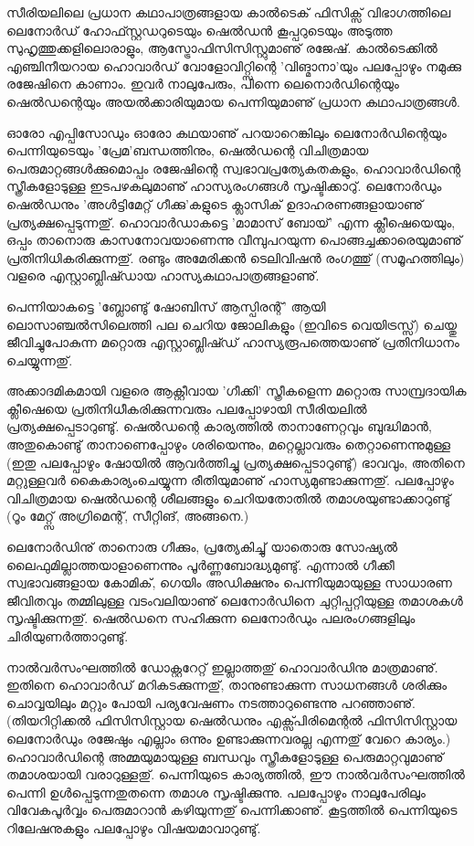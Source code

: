 സീരിയലിലെ പ്രധാന കഥാപാത്രങ്ങളായ കാല്‍ടെക് ഫിസിക്സ് വിഭാഗത്തിലെ ലെനോര്‍ഡ് ഹോഫ്സ്റ്റഡറുടെയും ഷെല്‍ഡന്‍ 
കൂപ്പറുടെയും അടുത്ത സുഹൃത്തുക്കളിലൊരാളും, ആസ്ട്രോഫിസിസിസ്റ്റുമാണു് രജേഷ്. കാല്‍ടെക്കില്‍ എഞ്ചിനീയറായ
 ഹൊവാര്‍ഡ് വോളോവിറ്റ്സിന്റെ 'വിങ്മാനാ'യും പലപ്പോഴും നമുക്കു രജേഷിനെ കാണാം. ഇവര്‍ നാലുപേരും, പിന്നെ 
 ലെനൊര്‍ഡിന്റെയും ഷെല്‍ഡന്റെയും അയല്‍ക്കാരിയുമായ പെന്നിയുമാണു് പ്രധാന കഥാപാത്രങ്ങള്‍.

ഓരോ എപ്പിസോഡും ഓരോ കഥയാണു് പറയാറെങ്കിലും ലെനോര്‍ഡിന്റെയും പെന്നിയുടെയും 'പ്രേമ'ബന്ധത്തിനും, ഷെല്‍ഡന്റെ 
വിചിത്രമായ പെരുമാറ്റങ്ങള്‍ക്കുമൊപ്പം രജേഷിന്റെ സ്വഭാവപ്രത്യേകതകളും, ഹൊവാര്‍ഡിന്റെ സ്ത്രീകളോടുള്ള ഇടപഴകലുമാണു് 
ഹാസ്യരംഗങ്ങള്‍ സൃഷ്ടിക്കാറു്. ലെനോര്‍ഡും ഷെല്‍ഡനും 'അള്‍ട്ടിമേറ്റ് ഗീക്കു'കളുടെ ക്ലാസിക് ഉദാഹരണങ്ങളായാണു് 
പ്രത്യക്ഷപ്പെടുന്നതു്. ഹൊവാര്‍ഡാകട്ടെ 'മാമാസ് ബോയ്' എന്ന ക്ലീഷെയെയും, ഒപ്പം താനൊരു കാസനോവയാണെന്നു 
വീമ്പുപറയുന്ന പൊങ്ങച്ചക്കാരെയുമാണു് പ്രതിനിധികരിക്കുന്നതു്. രണ്ടും അമേരിക്കന്‍ ടെലിവിഷന്‍ രംഗത്തു് (സമൂഹത്തിലും)
 വളരെ എസ്റ്റാബ്ലിഷ്ഡായ ഹാസ്യകഥാപാത്രങ്ങളാണു്.

പെന്നിയാകട്ടെ 'ബ്ലോണ്ടു് ഷോബിസ് ആസ്പിരന്റ്' ആയി ലൊസാഞ്ചല്‍സിലെത്തി പല ചെറിയ ജോലികളും (ഇവിടെ വെയിട്രസ്സ്)
 ചെയ്തു ജീവിച്ചുപോകുന്ന മറ്റൊരു എസ്റ്റാബ്ലിഷ്ഡ് ഹാസ്യരൂപത്തെയാണു് പ്രതിനിധാനം ചെയ്യുന്നതു്.

അക്കാദമികമായി വളരെ ആക്റ്റീവായ 'ഗീക്കി' സ്ത്രീകളെന്ന മറ്റൊരു സാമ്പ്രദായിക ക്ലീഷെയെ പ്രതിനിധീകരിക്കുന്നവരും 
പലപ്പോഴായി സീരിയലില്‍ പ്രത്യക്ഷപ്പെടാറുണ്ടു്. ഷെല്‍ഡന്റെ കാര്യത്തില്‍ താനാണേറ്റവും ബുദ്ധിമാന്‍, അതുകൊണ്ടു് 
താനാണെപ്പോഴും ശരിയെന്നും, മറ്റെല്ലാവരും തെറ്റാണെന്നുമുള്ള (ഇതു പലപ്പോഴും ഷോയില്‍ ആവര്‍ത്തിച്ചു പ്രത്യക്ഷപ്പെടാറുണ്ടു്) 
ഭാവവും, അതിനെ മറ്റുള്ളവര്‍ കൈകാര്യംചെയ്യുന്ന രീതിയുമാണു് ഹാസ്യമുണ്ടാക്കുന്നതു്. പലപ്പോഴും വിചിത്രമായ ഷെല്‍ഡന്റെ 
ശീലങ്ങളും ചെറിയതോതില്‍ തമാശയുണ്ടാക്കാറുണ്ടു് (റൂം മേറ്റ്സ് അഗ്രിമെന്റ്, സീറ്റിങ്, അങ്ങനെ.)

ലെനോര്‍ഡിനു് താനൊരു ഗീക്കും, പ്രത്യേകിച്ചു് യാതൊരു സോഷ്യല്‍ ലൈഫുമില്ലാത്തയാളാണെന്നും പൂര്‍ണ്ണബോദ്ധ്യമുണ്ടു്. 
എന്നാല്‍ ഗീക്കീ സ്വഭാവങ്ങളായ കോമിക്, ഗെയിം അഡിക്ഷനും പെന്നിയുമായുള്ള സാധാരണ ജീവിതവും തമ്മിലുള്ള
 വടംവലിയാണു് ലെനോര്‍ഡിനെ ചുറ്റിപ്പറ്റിയുള്ള തമാശകള്‍ സൃഷ്ടിക്കുന്നതു്. ഷെല്‍ഡനെ സഹിക്കുന്ന ലെനോര്‍ഡും പലരംഗങ്ങളിലും
  ചിരിയുണര്‍ത്താറുണ്ടു്.

നാല്‍വര്‍സംഘത്തില്‍ ഡോക്റ്ററേറ്റ് ഇല്ലാത്തതു് ഹൊവാര്‍ഡിനു മാത്രമാണു്. ഇതിനെ ഹൊവാര്‍ഡ് മറികടക്കുന്നതു്, 
താനുണ്ടാക്കുന്ന സാധനങ്ങള്‍ ശരിക്കും ചൊവ്വയിലും മറ്റും പോയി പര്യവേഷണം നടത്താറുണ്ടെന്നു പറഞ്ഞാണു്. (തിയറിറ്റിക്കല്‍ 
ഫിസിസിസ്റ്റായ ഷെല്‍ഡനും എക്സ്പിരിമെന്റല്‍ ഫിസിസിസ്റ്റായ ലെനോര്‍ഡും രജേഷും എല്ലാം ഒന്നും ഉണ്ടാക്കുന്നവരല്ല എന്നതു്
 വേറെ കാര്യം.) ഹൊവാര്‍ഡിന്റെ അമ്മയുമായുള്ള ബന്ധവും സ്ത്രീകളോടുള്ള പെരുമാറ്റവുമാണു് തമാശയായി വരാറുള്ളതു്. 
 പെന്നിയുടെ കാര്യത്തില്‍, ഈ നാല്‍വര്‍സംഘത്തില്‍ പെന്നി ഉള്‍പ്പെടുന്നതുതന്നെ തമാശ സൃഷ്ടിക്കുന്നു. പലപ്പോഴും നാലുപേരിലും
  വിവേകപൂര്‍വ്വം പെരുമാറാന്‍ കഴിയുന്നതു് പെന്നിക്കാണു്. കൂട്ടത്തില്‍ പെന്നിയുടെ റിലേഷനുകളും പലപ്പോഴും വിഷയമാവാറുണ്ടു്.

